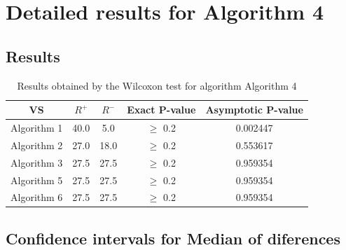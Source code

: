 \documentclass[a4paper,10pt]{article}
\begin{document}
 \clearpage 


\section{Detailed results for Algorithm 4}


\subsection{Results}

\begin{table}[!htp]
\centering\small
\begin{tabular}{
|c|c|c|c|c|}
\hline
 VS & $R^{+}$ & $R^{-}$ & Exact P-value & Asymptotic P-value \\ \hline 
Algorithm 1 & 40.0 & 5.0 & $\geq$ 0.2 & 0.002447\\ \hline 
Algorithm 2 & 27.0 & 18.0 & $\geq$ 0.2 & 0.553617\\ \hline 
Algorithm 3 & 27.5 & 27.5 & $\geq$ 0.2 & 0.959354\\ \hline 
Algorithm 5 & 27.5 & 27.5 & $\geq$ 0.2 & 0.959354\\ \hline 
Algorithm 6 & 27.5 & 27.5 & $\geq$ 0.2 & 0.959354\\ \hline 

\end{tabular}
\caption{Results obtained by the Wilcoxon test for algorithm Algorithm 4}
\end{table}

\subsection{Confidence intervals for Median of diferences}
\end{document}
